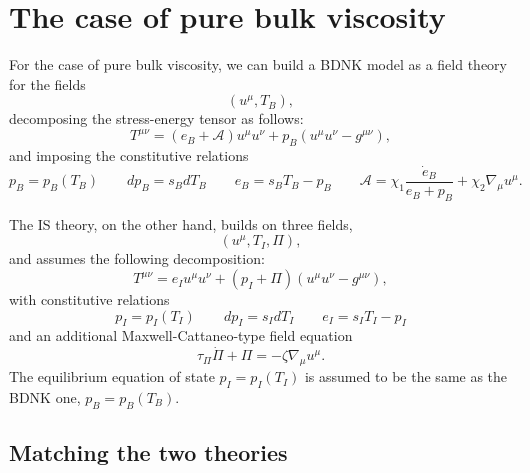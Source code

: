 \documentclass[12pt,onecolumn,showpacs,amssymb,aps,nofootinbib,floatfix]{revtex4-2}
\begin{document}
	\section{The case of pure bulk viscosity \label{bulkvisc}}
	For the case of pure bulk viscosity, we can build a BDNK model as a field theory for the fields 
	\begin{equation}
		(u^\mu,T_B),
	\end{equation}
	decomposing the stress-energy tensor as follows:
	\begin{equation}
		\label{stressdeco}
		T^{\mu \nu} = (e_B + \mathcal{A})u^\mu u^\nu + p_B(u^\mu u^\nu - g^{\mu \nu}),
	\end{equation}
	and imposing the constitutive relations
	\begin{equation}\label{constitutiveBDNK}
		p_B =p_B(T_B)  \quad \quad dp_B = s_B dT_B \quad \quad e_B = s_B T_B -p_B  \quad \quad \mathcal{A}= \chi_1 \frac{\dot{e}_B}{e_B +p_B} + \chi_2 \nabla_\mu u^\mu.
	\end{equation}
	
	
	The IS theory, on the other hand, builds on three fields, 
	\begin{equation}
		(u^\mu,T_I,\Pi),
	\end{equation}
	and assumes the following decomposition:
	\begin{equation}
		\label{isdeco}
		T^{\mu \nu} = e_I u^\mu u^\nu + (p_I+\Pi)( u^\mu u^\nu -g^{\mu \nu}),
	\end{equation}
	with constitutive relations
	\begin{equation}\label{ConstitutiveIS}
		p_I =p_I(T_I)  \quad \quad dp_I = s_I dT_I \quad \quad e_I = s_I T_I -p_I 
	\end{equation}
	and an additional Maxwell-Cattaneo-type field equation \cite{JouBulk}
	\begin{equation}\label{IsraelRelax}
		\tau_\Pi \dot{\Pi} + \Pi = -\zeta \nabla_\mu u^\mu.
	\end{equation}
	The equilibrium equation of state $p_I=p_I(T_I)$ is assumed to be the same as the BDNK one, $p_B =p_B(T_B)$.
	
	
	
	\subsection{Matching the two theories\label{match}}
	
\end{document}
